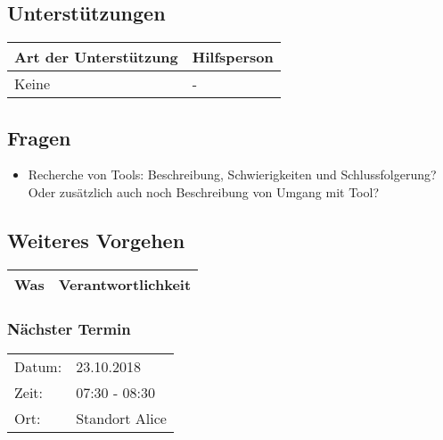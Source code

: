 \vspace{1cm}

\subsection*{Unterstützungen}
\begin{table}[H]
    \centering
    \begin{tabular}{p{12cm} p{4cm}}
        \textbf{Art der Unterstützung} & \textbf{Hilfsperson} \\ \hline
        Keine & - \\ \hline
    \end{tabular}
\end{table}

\vspace{1cm}

\subsection*{Fragen}
\begin{itemize}
    \item Recherche von Tools: Beschreibung, Schwierigkeiten und Schlussfolgerung? Oder zusätzlich auch noch Beschreibung von Umgang mit Tool?


\end{itemize}

\vspace{1cm}

\subsection*{Weiteres Vorgehen}
\begin{table}[H]
    \centering
    \begin{tabular}{p{12cm} p{4cm}}
        \textbf{Was} & \textbf{Verantwortlichkeit} \\ \hline
    \end{tabular}
\end{table}

\subsubsection*{Nächster Termin}

\begin{tabular}{p{4cm} p{12cm}}
    Datum: & 23.10.2018 \\
    Zeit: & 07:30 - 08:30 \\
    Ort: & Standort Alice \\
\end{tabular}

